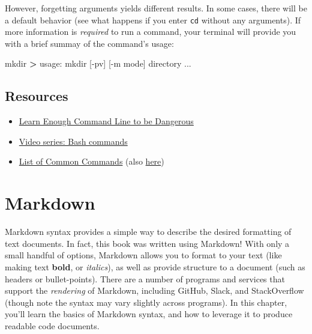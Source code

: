 \documentclass[]{book}
\newenvironment{Shaded}{\begin{snugshade}}{\end{snugshade}}
\newcommand{\FunctionTok}[1]{\textcolor[rgb]{0.00,0.00,0.00}{#1}}
\newcommand{\OperatorTok}[1]{\textcolor[rgb]{0.81,0.36,0.00}{\textbf{#1}}}
\newcommand{\ExtensionTok}[1]{#1}
\newcommand{\NormalTok}[1]{#1}
\providecommand{\tightlist}{%
  \setlength{\itemsep}{0pt}\setlength{\parskip}{0pt}}
\theoremstyle{definition}
\theoremstyle{definition}
\theoremstyle{remark}
\begin{document}
However, forgetting arguments yields different results. In some cases,
there will be a default behavior (see what happens if you enter
\texttt{cd} without any arguments). If more information is
\emph{required} to run a command, your terminal will provide you with a
brief summay of the command's usage:

\begin{Shaded}
\begin{Highlighting}[]
\FunctionTok{mkdir}
\OperatorTok{>} \ExtensionTok{usage}\NormalTok{: mkdir [-pv] [-m mode] directory ...}
\end{Highlighting}
\end{Shaded}

\section*{Resources}\label{resources-1}


\begin{itemize}
\tightlist
\item
  \href{https://www.learnenough.com/command-line-tutorial\#sec-basics}{Learn
  Enough Command Line to be Dangerous}
\item
  \href{https://www.youtube.com/watch?v=sqYUYHn-HKg\&list=PLCAF7D691FFA25555}{Video
  series: Bash commands}
\item
  \href{http://www.lagmonster.org/docs/unix/intro-137.html}{List of
  Common Commands} (also
  \href{http://www.math.utah.edu/lab/unix/unix-commands.html}{here})
\end{itemize}

\hypertarget{markdown}{\chapter{Markdown}\label{markdown}}

Markdown syntax provides a simple way to describe the desired formatting
of text documents. In fact, this book was written using Markdown! With
only a small handful of options, Markdown allows you to format to your
text (like making text \textbf{bold}, or \emph{italics}), as well as
provide structure to a document (such as headers or bullet-points).
There are a number of programs and services that support the
\emph{rendering} of Markdown, including GitHub, Slack, and StackOverflow
(though note the syntax may vary slightly across programs). In this
chapter, you'll learn the basics of Markdown syntax, and how to leverage
it to produce readable code documents.
\end{document}
